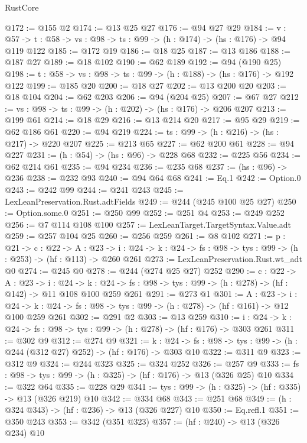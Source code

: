 \begin{lexlean}{RustCore}
\begin{coremodule}
@172 := @155 @2
@174 := @13 @25 @27
@176 := @94 @27 @29
@184 := {v : @57} ->
  {t : @58} -> {vs : @98} -> {ts : @99} -> (h : @174) -> (hs : @176) -> @94 @119 @122
@185 := @172 @19
@186 := @18 @25
@187 := @13 @186
@188 := @187 @27
@189 := @18 @102
@190 := @62 @189
@192 := @94 (@190 @25)
@198 := {t : @58} -> {vs : @98} -> {ts : @99} -> (h : @188) -> (hs : @176) -> @192 @122
@199 := @185 @20
@200 := @18 @27
@202 := @13 @200 @20
@203 := @18 @104
@204 := @62 @203
@206 := @94 (@204 @25)
@207 := @67 @27
@212 := {vs : @98} -> {ts : @99} -> (h : @202) -> (hs : @176) -> @206 @207
@213 := @199 @61
@214 := @18 @29
@216 := @13 @214 @20
@217 := @95 @29
@219 := @62 @186 @61
@220 := @94 @219
@224 := {ts : @99} -> (h : @216) -> (hs : @217) -> @220 @207
@225 := @213 @65
@227 := @62 @200 @61
@228 := @94 @227
@231 := (h : @54) -> (hs : @96) -> @228 @68
@232 := @225 @56
@234 := @62 @214 @61
@235 := @94 @234
@236 := @235 @68
@237 := (hs : @96) -> @236
@238 := @232 @93
@240 := @94 @64 @68
@241 := Eq.{1}
@242 := Option.{0}
@243 := @242 @99
@244 := @241 @243
@245 := LexLeanPreservation.Rust.adtFields
@249 := @244 (@245 @100 @25 @27)
@250 := Option.some.{0}
@251 := @250 @99
@252 := @251 @4
@253 := @249 @252
@256 := @7 @114 @108 @100
@257 := LexLeanTarget.TargetSyntax.Value.adt
@259 := @257 @104 @25
@260 := @256 @259
@261 := @8 @102
@271 := {p : @21} ->
  {c : @22} ->
  {A : @23} ->
  {i : @24} -> {k : @24} -> {fs : @98} -> {tys : @99} -> (h : @253) -> (hf : @113) -> @260 @261
@273 := LexLeanPreservation.Rust.wt_adt @0
@274 := @245 @0
@278 := @244 (@274 @25 @27) @252
@290 := {c : @22} ->
  {A : @23} ->
  {i : @24} ->
  {k : @24} -> {fs : @98} -> {tys : @99} -> (h : @278) -> (hf : @142) -> @11 @108 @100 @259 @261
@291 := @273 @1
@301 := {A : @23} ->
  {i : @24} ->
  {k : @24} -> {fs : @98} -> {tys : @99} -> (h : @278) -> (hf : @161) -> @12 @100 @259 @261
@302 := @291 @2
@303 := @13 @259
@310 := {i : @24} ->
  {k : @24} -> {fs : @98} -> {tys : @99} -> (h : @278) -> (hf : @176) -> @303 @261
@311 := @302 @9
@312 := @274 @9
@321 := {k : @24} ->
  {fs : @98} -> {tys : @99} -> (h : @244 (@312 @27) @252) -> (hf : @176) -> @303 @10
@322 := @311 @9
@323 := @312 @9
@324 := @244 @323
@325 := @324 @252
@326 := @257 @9
@333 := {fs : @98} -> {tys : @99} -> (h : @325) -> (hf : @176) -> @13 (@326 @25) @10
@334 := @322 @64
@335 := @228 @29
@341 := {tys : @99} -> (h : @325) -> (hf : @335) -> @13 (@326 @219) @10
@342 := @334 @68
@343 := @251 @68
@349 := (h : @324 @343) -> (hf : @236) -> @13 (@326 @227) @10
@350 := Eq.refl.{1}
@351 := @350 @243
@353 := @342 (@351 @323)
@357 := (hf : @240) -> @13 (@326 @234) @10

\end{coremodule}
\end{lexlean}
